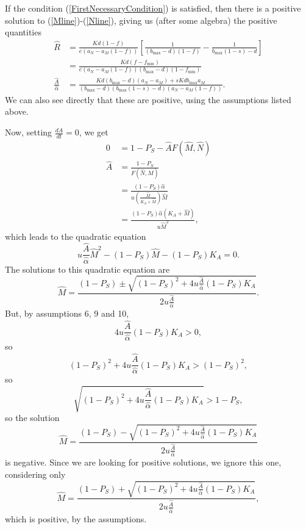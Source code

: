 \documentclass[letterpaper,11pt]{article}
\newcommand{\hA}{\hat{A}}
\newcommand{\hR}{\hat{R}}
\newcommand{\hM}{\hat{M}}
\newcommand{\hN}{\hat{N}}
\newcommand{\halph}{\hat{\alpha}}
\newcommand{\bmax}{b_{\text{max}}}
\newcommand{\fmin}{f_{\text{min}}}
\begin{document}
If the condition (\ref{FirstNecessaryCondition}) is satisfied, then there is a positive solution to (\ref{Mline})-(\ref{Nline}),
giving us (after some algebra) the positive quantities
\begin{align}
\hR &= \frac{Kd(1-f)}{e(a_N-a_M (1-f))}\left[ \frac{1}{(\bmax-d)(1-f)}-\frac{1}{\bmax(1-s)-d} \right] \\
&= \frac{Kd(f-\fmin)}{e(a_N-a_M(1-f))(\bmax-d)(1-\fmin)} \label{SecondhRExpression}\\
\frac{\hA}{\halph} &= \frac{Kd(\bmax-d)(a_N-a_M)+sKd\bmax a_M}{(\bmax-d)(\bmax(1-s)-d)(a_N-a_M(1-f))}.
\end{align}
We can also see directly that these are positive, using the assumptions listed above.

Now, setting $\frac{dA}{dt}=0$, we get
\begin{align}
0 &= 1-P_S -\hA F(\hM,\hN) \\
\hA &= \frac{1-P_S}{F(\hN,\hM)} \\
&= \frac{(1-P_S)\halph}{u\left( \frac{\hM}{K_A+\hM} \right)\hM} \\
&= \frac{(1-P_S)\halph (K_A+\hM)}{u \hM^2},
\end{align}
which leads to the quadratic equation
\begin{equation}
u\frac{\hA}{\halph}\hM^2-(1-P_S)\hM-(1-P_S)K_A=0.
\end{equation}
The solutions to this quadratic equation are
\begin{equation}
\hM = \frac{(1-P_S) \pm \sqrt{(1-P_S)^2+4u\frac{\hA}{\halph}(1-P_S)K_A}}{2u\frac{\hA}{\halph}}.
\end{equation}
But, by assumptions 6, 9 and 10, 
\begin{equation}
4u\frac{\hA}{\halph}(1-P_S)K_A>0, 
\end{equation}
so 
\begin{equation}
(1-P_S)^2+4u\frac{\hA}{\halph}(1-P_S)K_A>(1-P_S)^2, 
\end{equation}
so
\begin{equation}
\sqrt{(1-P_S)^2+4u\frac{\hA}{\halph}(1-P_S)K_A}>1-P_S,
\end{equation}
so the solution
\begin{equation}
\hM = \frac{(1-P_S) - \sqrt{(1-P_S)^2+4u\frac{\hA}{\halph}(1-P_S)K_A}}{2u\frac{\hA}{\halph}}
\end{equation}
is negative. Since we are looking for positive solutions, we ignore this one, considering only
\begin{equation}
\hM = \frac{(1-P_S) + \sqrt{(1-P_S)^2+4u\frac{\hA}{\halph}(1-P_S)K_A}}{2u\frac{\hA}{\halph}},
\end{equation}
which is positive, by the assumptions.
\end{document}
